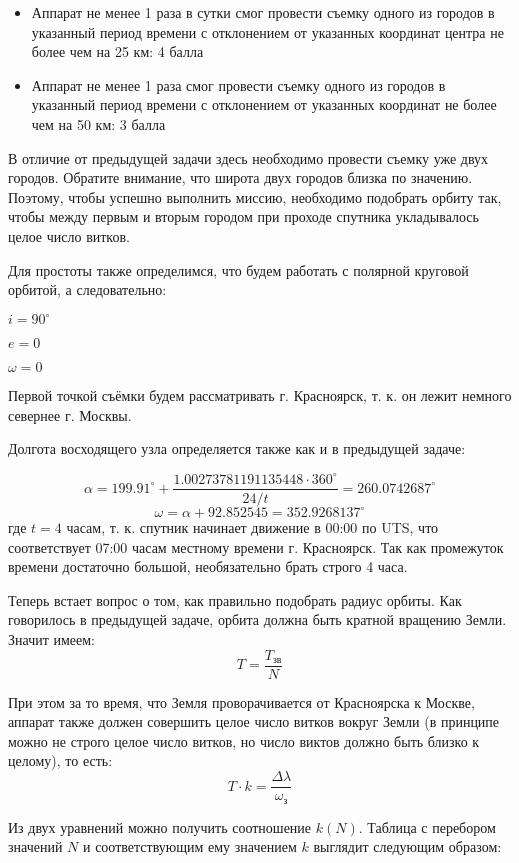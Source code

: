 \begin{itemize}
    \item Аппарат не менее 1 раза в сутки смог провести съемку одного из городов в указанный период времени с отклонением от указанных координат центра не более чем на 25 км: 4 балла
    \item Аппарат не менее 1 раза смог провести съемку одного из городов в указанный период времени с отклонением от указанных координат не более чем на 50 км: 3 балла
\end{itemize}

\solutionSection

В отличие от предыдущей задачи здесь необходимо провести съемку уже двух городов. 
Обратите внимание, что широта двух городов близка по значению. Поэтому, чтобы успешно выполнить миссию, 
необходимо подобрать орбиту так, чтобы между первым и вторым городом при проходе спутника укладывалось 
целое число витков.

Для простоты также определимся, что будем работать с полярной круговой орбитой, а следовательно:

$i = 90^\circ$

$e = 0$

$\omega = 0$

Первой точкой съёмки будем рассматривать г. Красноярск, т. к. он лежит немного севернее г. Москвы.

Долгота восходящего узла определяется также как и в предыдущей задаче:

$$\alpha = 199.91^\circ + \frac{1.00273781191135448 \cdot 360^\circ}{24/t} = 260.0742687^\circ$$
$$\omega = \alpha + 92.852545 = 352.9268137^\circ$$
где $t=4$ часам, т. к. спутник начинает движение в 00:00 по UTS, что соответствует 07:00 часам местному времени 
г. Красноярск. Так как промежуток времени достаточно большой, необязательно брать строго 4 часа.

Теперь встает вопрос о том, как правильно подобрать радиус орбиты. Как говорилось в предыдущей задаче, 
орбита должна быть кратной вращению Земли. Значит имеем:
$$T=\frac{T_\text{зв}}{N}$$

При этом за то время, что Земля проворачивается от Красноярска к Москве, аппарат также должен совершить 
целое число витков вокруг Земли (в принципе можно не строго целое число витков, но число виктов должно 
быть близко к целому), то есть:
$$T\cdot k=\frac{\Delta \lambda}{\omega_\text{з}} $$

Из двух уравнений можно получить соотношение $k(N)$. Таблица с перебором значений $N$ и соответствующим ему 
значением $k$ выглядит следующим образом:

